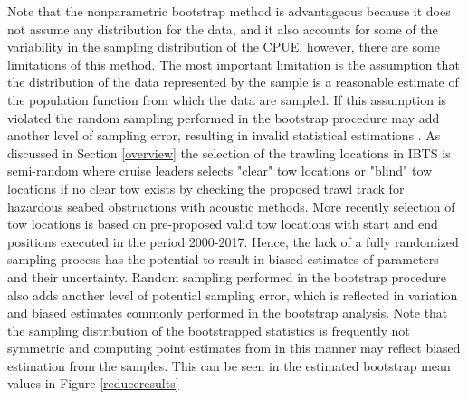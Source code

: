 \documentclass[a4paper 12pt]{article}
\numberwithin{equation}{section}
\begin{document}
\clearpage
Note that the nonparametric bootstrap method is advantageous  because it does not assume any distribution for the data, and it also accounts for some of the variability in the sampling distribution of the CPUE, however, there are some limitations of this method. The most important limitation is the assumption that the distribution of the data represented by the sample is a reasonable estimate of the population function from which the data are sampled. If this assumption is violated the random sampling  performed in the bootstrap procedure may add another level of sampling error, resulting in invalid statistical estimations \citep{haukoos2005advanced}. As discussed in Section \ref{overview} the selection of the trawling locations in IBTS is semi-random where cruise leaders selects "clear" tow locations or "blind" tow locations if no clear tow exists by checking the proposed trawl track for hazardous seabed obstructions with acoustic methods. More recently selection of tow locations is based on pre-proposed valid tow locations with start and end positions executed in the period 2000-2017. Hence, the lack of a fully randomized sampling process has the potential to result in biased estimates of parameters and their uncertainty. Random sampling performed in the bootstrap procedure also adds another level of potential sampling error, which is reflected in variation and biased estimates commonly performed in the bootstrap analysis. Note that the sampling distribution of the bootstrapped statistics is frequently not symmetric and computing point estimates from in this manner may reflect biased estimation from the samples. This can be seen in the estimated bootstrap mean values in Figure \ref{reduceresults}


\clearpage
\end{document}
